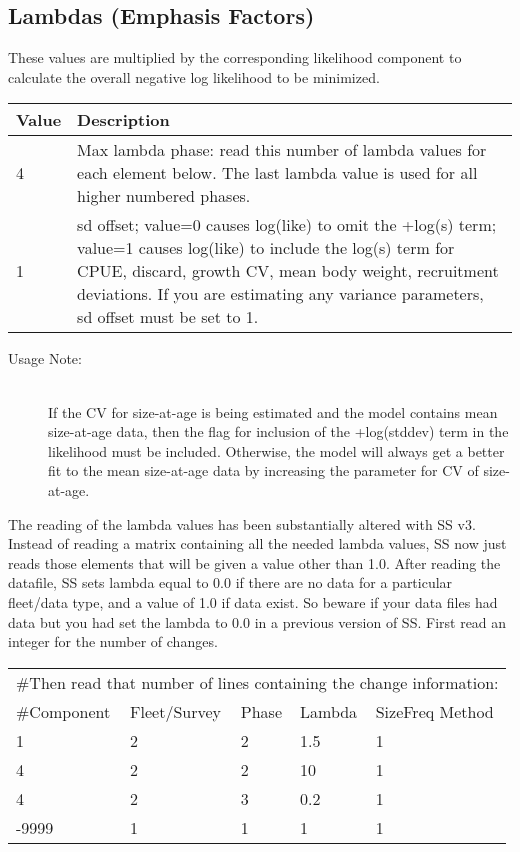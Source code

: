 \subsection{Lambdas (Emphasis Factors)}
These values are multiplied by the corresponding likelihood component to calculate the overall negative log likelihood to be minimized.

\begin{center}
	\begin{tabular}{p{2cm} p{14cm}}
		Value & Description \\
		\hline
		4 & Max lambda phase: read this number of lambda values for each element below.  The last lambda value is used for all higher numbered phases.\\
		1 & sd offset; value=0 causes log(like) to omit the +log(s) term; value=1 causes log(like) to include the log(s) term for CPUE, discard, growth CV, mean body weight, recruitment deviations. If you are estimating any variance parameters, sd offset must be set to 1.  \\
		\hline
	\end{tabular}
\end{center}

\begin{description}
	\item[Usage Note:]\hfil\\
	If the CV for size-at-age is being estimated and the model contains mean size-at-age data, then the flag for inclusion of the +log(stddev) term in the likelihood must be included.  Otherwise, the model will always get a better fit to the mean size-at-age data by increasing the parameter for CV of size-at-age.
\end{description}

The reading of the lambda values has been substantially altered with SS v3.  Instead of reading a matrix containing all the needed lambda values, SS now just reads those elements that will be given a value other than 1.0.  After reading the datafile, SS sets lambda equal to 0.0 if there are no data for a particular fleet/data type, and a value of 1.0 if data exist.  So beware if your data files had data but you had set the lambda to 0.0 in a previous version of SS.  First read an integer for the number of changes.

\pagebreak
\begin{center}
	\begin{longtable}{p{3cm} p{3cm} p{2cm} p{3cm} p{3cm}}
		\hline
		\multicolumn{5}{l}{\#Then read that number of lines containing the change information:}\\
		\#Component & Fleet/Survey & Phase & Lambda & SizeFreq Method \\
		\hline
		1 & 2 & 2 & 1.5 & 1 \\
		4 & 2 & 2 & 10 & 1 \\
		4 & 2 & 3 & 0.2 & 1 \\
		-9999 & 1 & 1 & 1 & 1 \\
		\hline
	\end{longtable}
\end{center}


